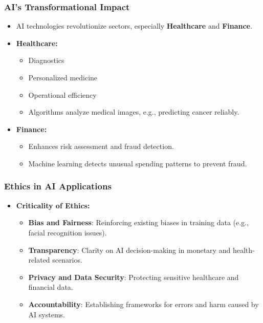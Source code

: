 \documentclass[aspectratio=169]{beamer}
\begin{document}
\begin{frame}[fragile]
    \frametitle{AI's Transformational Impact}
    
    \begin{itemize}
        \item AI technologies revolutionize sectors, especially \textbf{Healthcare} and \textbf{Finance}.
        
        \item \textbf{Healthcare:}
            \begin{itemize}
                \item Diagnostics
                \item Personalized medicine
                \item Operational efficiency
                \item Algorithms analyze medical images, e.g., predicting cancer reliably.
            \end{itemize}
        
        \item \textbf{Finance:}
            \begin{itemize}
                \item Enhances risk assessment and fraud detection.
                \item Machine learning detects unusual spending patterns to prevent fraud.
            \end{itemize}

    \end{itemize}
\end{frame}

\begin{frame}[fragile]
    \frametitle{Ethics in AI Applications}
    
    \begin{itemize}
        \item \textbf{Criticality of Ethics:}
            \begin{itemize}
                \item \textbf{Bias and Fairness}: Reinforcing existing biases in training data (e.g., facial recognition issues).
                \item \textbf{Transparency}: Clarity on AI decision-making in monetary and health-related scenarios.
                \item \textbf{Privacy and Data Security}: Protecting sensitive healthcare and financial data.
                \item \textbf{Accountability}: Establishing frameworks for errors and harm caused by AI systems.
            \end{itemize}
    \end{itemize}    
\end{frame}
\end{document}

